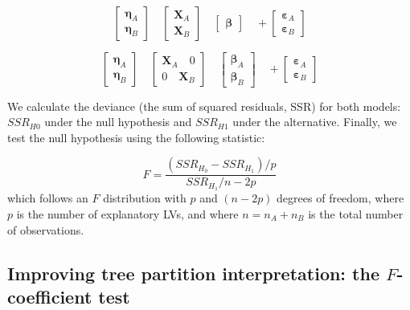 \[\label{eq22}
\left[\begin{array}{l}
\boldsymbol{\eta}_A \\
\boldsymbol{\eta}_B 
\end{array}\right] \quad
\left[\begin{array}{l}
\textbf{X}_A \\
\textbf{X}_B 
\end{array}\right] \quad
\left[\begin{array}{l}
\boldsymbol{\beta}
\end{array}\right]  \quad +
\left[\begin{array}{l}
\boldsymbol{\varepsilon}_A \\
\boldsymbol{\varepsilon}_B 
\end{array}\right]\]

\[\label{eq23}
\left[\begin{array}{l}
\boldsymbol{\eta}_A \\
\boldsymbol{\eta}_B 
\end{array}\right] \quad
\left[\begin{array}{cc}
\textbf{X}_A \quad0\\
0 \quad\textbf{X}_B 
\end{array}\right] \quad
\left[\begin{array}{l}
\boldsymbol{\beta}_A \\
\boldsymbol{\beta}_B
\end{array}\right]  \quad +
\left[\begin{array}{l}
\boldsymbol{\varepsilon}_A \\
\boldsymbol{\varepsilon}_B 
\end{array}\right]\]

We calculate the deviance (the sum of squared residuals, SSR) for both
models: \(SSR_{H0}\) under the null hypothesis and \(SSR_{H1}\) under the
alternative. Finally, we test the null hypothesis using the following
statistic:

\[\label{F_global}
F  = \frac{\left(SSR_{H_0}-SSR_{H_1}\right) \Bigg/p}{SSR_{H_1}\Bigg/n-2p}\]
which follows an \(F\) distribution with \(p\) and \(\left(n - 2p\right)\)
degrees of freedom, where \(p\) is the number of explanatory LVs, and
where \(n = n_A + n_B\) is the total number of observations.

\hypertarget{improving-tree-partition-interpretation-the-f-coefficient-test}{%
\subsection{\texorpdfstring{Improving tree partition interpretation: the \(F\)-coefficient test}{Improving tree partition interpretation: the F-coefficient test}}\label{improving-tree-partition-interpretation-the-f-coefficient-test}}

